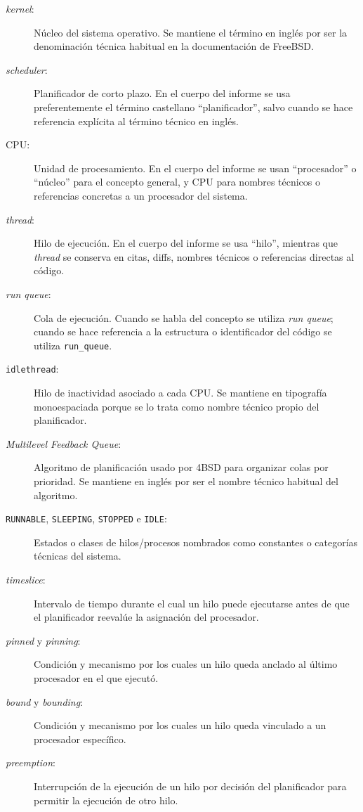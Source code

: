 \begin{description}
    \item[\textit{kernel}:] Núcleo del sistema operativo. Se mantiene el término en inglés por ser la denominación técnica habitual en la documentación de FreeBSD.
    \item[\textit{scheduler}:] Planificador de corto plazo. En el cuerpo del informe se usa preferentemente el término castellano ``planificador'', salvo cuando se hace referencia explícita al término técnico en inglés.
    \item[CPU:] Unidad de procesamiento. En el cuerpo del informe se usan ``procesador'' o ``núcleo'' para el concepto general, y CPU para nombres técnicos o referencias concretas a un procesador del sistema.
    \item[\textit{thread}:] Hilo de ejecución. En el cuerpo del informe se usa ``hilo'', mientras que \textit{thread} se conserva en citas, diffs, nombres técnicos o referencias directas al código.
    \item[\textit{run queue}:] Cola de ejecución. Cuando se habla del concepto se utiliza \textit{run queue}; cuando se hace referencia a la estructura o identificador del código se utiliza \texttt{run\_queue}.
    \item[\texttt{idlethread}:] Hilo de inactividad asociado a cada CPU. Se mantiene en tipografía monoespaciada porque se lo trata como nombre técnico propio del planificador.
    \item[\textit{Multilevel Feedback Queue}:] Algoritmo de planificación usado por 4BSD para organizar colas por prioridad. Se mantiene en inglés por ser el nombre técnico habitual del algoritmo.
    \item[\texttt{RUNNABLE}, \texttt{SLEEPING}, \texttt{STOPPED} e \texttt{IDLE}:] Estados o clases de hilos/procesos nombrados como constantes o categorías técnicas del sistema.
    \item[\textit{timeslice}:] Intervalo de tiempo durante el cual un hilo puede ejecutarse antes de que el planificador reevalúe la asignación del procesador.
    \item[\textit{pinned} y \textit{pinning}:] Condición y mecanismo por los cuales un hilo queda anclado al último procesador en el que ejecutó.
    \item[\textit{bound} y \textit{bounding}:] Condición y mecanismo por los cuales un hilo queda vinculado a un procesador específico.
    \item[\textit{preemption}:] Interrupción de la ejecución de un hilo por decisión del planificador para permitir la ejecución de otro hilo.

\end{description}
